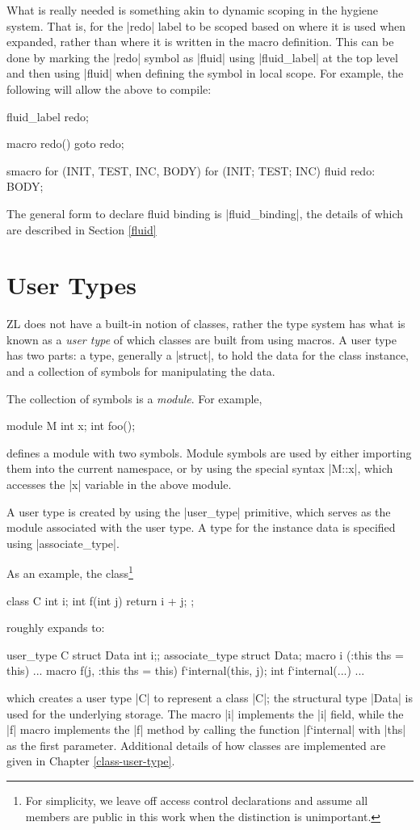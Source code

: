 What is really needed is something akin to dynamic scoping in the
hygiene system.  That is, for the |redo| label to be scoped based on
where it is used when expanded, rather than where it is written in the
macro definition.  This can be done by marking the |redo| symbol as
|fluid| using |fluid_label| at the top level and then using |fluid|
when defining the symbol in local scope.  For example, the following
will allow the above to compile:

\begin{code}
fluid_label redo;

macro redo() {goto redo;}

smacro for (INIT, TEST, INC, BODY) {
  for (INIT; TEST; INC) {
    fluid redo:
    BODY;
  }
}
\end{code}

The general form to declare fluid binding is |fluid_binding|, the
details of which are described in Section \ref{fluid}

\section{User Types}
\label{user-types-intro}

ZL does not have a built-in notion of classes, rather the type system
has what is known as a \textit{user type} of which classes are built
from using macros.  A user type has two parts: a type, generally a
|struct|, to hold the data for the class instance, and a collection of
symbols for manipulating the data.

The collection of symbols is a \textit{module}.  For example,
\begin{code}
module M { int x;
           int foo(); }
\end{code}
defines a module with two symbols.  Module symbols are used by either
importing them into the current namespace, or by using the
special syntax |M::x|, which accesses the |x| variable in the above
module.

A user type is created by using the |user_type| primitive, which
serves as the module associated with the user type.  A type for the
instance data is specified using |associate_type|.

As an example, the class\footnote{For simplicity, we leave off access
  control declarations and assume all members are public in this
  work when the distinction is unimportant.}
\begin{code}
class C { int i; 
          int f(int j) {return i + j;} };
\end{code}
roughly expands to:
\begin{code}
user_type C {
  struct Data {int i;};
  associate_type struct Data;
  macro i (:this ths = this) {...}
  macro f(j, :this ths = this) {f`internal(this, j);}
  int f`internal(...) {...}
}
\end{code}
which creates a user type |C| to represent a class |C|; the structural
type |Data| is used for the underlying storage.  The macro |i|
implements the |i| field, while the |f| macro implements the |f|
method by calling the function |f`internal| with |ths| as the first
parameter.  Additional details of how classes are implemented are
given in Chapter \ref{class-user-type}.

